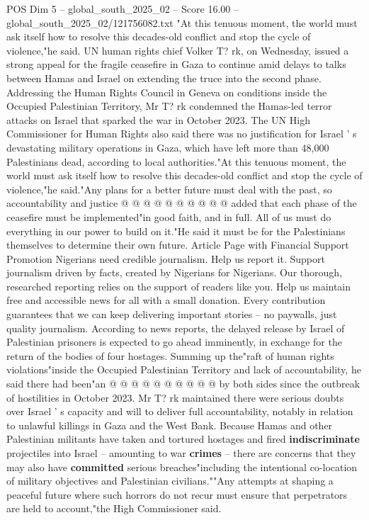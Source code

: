 \begin{textsample}{POS Dim 5 – global\_south\_2025\_02 – Score 16.00 – global\_south\_2025\_02/121756082.txt}  \label{ex:f5_pos_147}
"At this tenuous moment, the world must ask itself how to resolve this decades-old conflict and stop the cycle of violence,"he said.
UN human rights chief Volker T? rk, on Wednesday, issued a strong appeal for the fragile ceasefire in Gaza to continue amid delays to talks between Hamas and Israel on extending the truce into the second phase.
Addressing the Human Rights Council in Geneva on conditions inside the Occupied Palestinian Territory, Mr T? rk condemned the Hamas-led terror attacks on Israel that sparked the war in October 2023.
The UN High Commissioner for Human Rights also said there was no justification for Israel ' s devastating military operations in Gaza, which have left more than 48,000 Palestinians dead, according to local authorities."At this tenuous moment, the world must ask itself how to resolve this decades-old conflict and stop the cycle of violence,"he said."Any plans for a better future must deal with the past, so accountability and justice @ @ @ @ @ @ @ @ @ @ added that each phase of the ceasefire must be implemented"in good faith, and in full.
All of us must do everything in our power to build on it."He said it must be for the Palestinians themselves to determine their own future.
Article Page with Financial Support Promotion Nigerians need credible journalism.
Help us report it.
Support journalism driven by facts, created by Nigerians for Nigerians.
Our thorough, researched reporting relies on the support of readers like you.
Help us maintain free and accessible news for all with a small donation.
Every contribution guarantees that we can keep delivering important stories -- no paywalls, just quality journalism.
According to news reports, the delayed release by Israel of Palestinian prisoners is expected to go ahead imminently, in exchange for the return of the bodies of four hostages.
Summing up the"raft of human rights violations"inside the Occupied Palestinian Territory and lack of accountability, he said there had been"an @ @ @ @ @ @ @ @ @ @ by both sides since the outbreak of hostilities in October 2023.
Mr T? rk maintained there were serious doubts over Israel ' s capacity and will to deliver full accountability, notably in relation to unlawful killings in Gaza and the West Bank.
Because Hamas and other Palestinian militants have taken and tortured hostages and fired \textbf{indiscriminate} projectiles into Israel -- amounting to war \textbf{crimes} -- there are concerns that they may also have \textbf{committed} serious breaches"including the intentional co-location of military objectives and Palestinian civilians.""Any attempts at shaping a peaceful future where such horrors do not recur must ensure that perpetrators are held to account,"the High Commissioner said.

\end{textsample}
